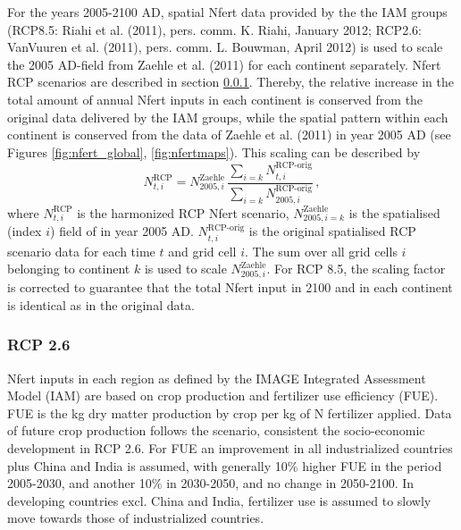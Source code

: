 \documentclass{myreport}
\begin{document}
For the years 2005-2100 AD, spatial Nfert data provided by the the IAM groups (RCP8.5: Riahi et al. (2011)\cite{riahi11cc}, pers. comm. K. Riahi, January 2012; RCP2.6: VanVuuren et al. (2011)\cite{vanvuuren11cc, bouwmannXXX}, pers. comm. L. Bouwman, April 2012) is used to scale the 2005 AD-field from Zaehle et al. (2011)\cite{zaehle11ngeo} for each continent separately. Nfert RCP scenarios are described in section \ref{sec:nfertscen}. Thereby, the relative increase in the total amount of annual Nfert inputs in each continent is conserved from the original data delivered by the IAM groups, while the spatial pattern within each continent is conserved from the data of Zaehle et al. (2011)\cite{zaehle11ngeo} in year 2005 AD (see Figures \ref{fig:nfert_global}, \ref{fig:nfertmaps}). This scaling can be described by
\begin{equation}
N^{\text{RCP}}_{t,i} = N^{\text{Zaehle}}_{2005,i} \,  \frac{\sum\limits_{i=k} N^{\text{RCP-orig}}_{t,i} }{\sum\limits_{i=k} N^{\text{RCP-orig}}_{2005,i} } \, ,
\end{equation}
where $N^{\text{RCP}}_{t,i}$ is the harmonized RCP Nfert scenario, $N^{\text{Zaehle}}_{2005,i=k}$ is the spatialised (index $i$) field of \citet{zaehle11ngeo} in year 2005 AD. $N^{\text{RCP-orig}}_{t,i}$ is the original spatialised RCP scenario data for each time $t$ and grid cell $i$. The sum over all grid cells $i$ belonging to continent $k$ is used to scale $N^{\text{Zaehle}}_{2005,i}$. For RCP 8.5, the scaling factor is corrected to guarantee that the total Nfert input in 2100 and in each continent is identical as in the original data.\\

\subsubsection{RCP 2.6}
\label{sec:nfertscen}

Nfert inputs in each region as defined by the IMAGE Integrated Assessment Model (IAM) are based on crop production and fertilizer use efficiency (FUE). FUE is the kg dry matter production by crop per kg of N fertilizer applied. Data of future crop production follows the scenario, consistent the socio-economic development in RCP 2.6. For FUE an improvement in all industrialized countries plus China and India is assumed, with generally 10\% higher FUE in the period 2005-2030, and another 10\% in 2030-2050, and no change in 2050-2100. In developing countries excl. China and India, fertilizer use is assumed to slowly move towards those of industrialized countries.\\
\end{document}
